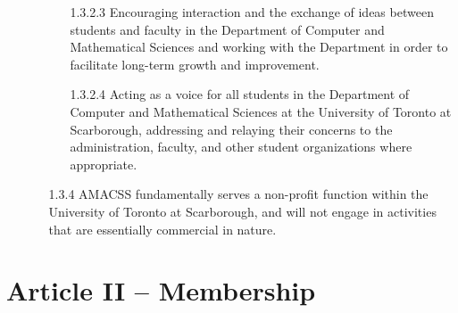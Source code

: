 \documentclass[12pt,a4paper]{article}
\begin{document}
\begin{enumerate}
\begin{enumerate}
\begin{enumerate}
\item[1.3.2.3] Encouraging interaction and the exchange of ideas between students and faculty in the Department of Computer and Mathematical Sciences and working with the Department in order to facilitate long-term growth and improvement.

\item[1.3.2.4] Acting as a voice for all students in the Department of Computer and Mathematical Sciences at the University of Toronto at Scarborough, addressing and relaying their concerns to the administration, faculty, and other student organizations where appropriate.
\end{enumerate}

\item[1.3.4] AMACSS fundamentally serves a non-profit function within the University of Toronto at Scarborough, and will not engage in activities that are essentially commercial in nature.
\end{enumerate}
\end{enumerate}

\section*{Article II – Membership}
\end{document}
